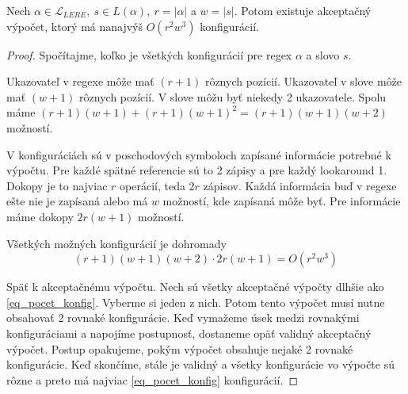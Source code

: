 \documentclass{svk_long_sk}
\def\lel{\mathscr{L}_{LERE}}
\begin{document}
\begin{lemma}\label{lema_dlzka_post_konfig}
Nech $\alpha \in \lel,~ s \in L(\alpha),~ r = |\alpha|$ a $w = |s|$. Potom existuje akceptačný výpočet, ktorý má nanajvýš $O(r^2w^3)$ konfigurácií.
\end{lemma}
\begin{proof}
Spočítajme, koľko je všetkých konfigurácií pre regex $\alpha$ a slovo $s$.

Ukazovateľ v regexe môže mať $(r+1)$ rôznych pozícií. Ukazovateľ v slove môže mať $(w+1)$ rôznych pozícií. V slove môžu byť niekedy 2 ukazovatele. Spolu máme $(r+1)(w+1)+(r+1)(w+1)^2 = (r+1)(w+1)(w+2)$ možností.

V konfiguráciách sú v poschodových symboloch zapísané informácie potrebné k výpočtu. Pre každé spätné referencie sú to 2 zápisy a pre každý lookaround 1. Dokopy je to najviac $r$ operácií, teda $2r$ zápisov. Každá informácia buď v regexe ešte nie je zapísaná alebo má $w$ možností, kde zapísaná môže byť. Pre informácie máme dokopy $2r(w+1)$ možností.

Všetkých možných konfigurácií je dohromady
\begin{equation}\label{eq_pocet_konfig}
(r+1)(w+1)(w+2)\cdot 2r(w+1) = O(r^2w^3)
\end{equation}

Späť k akceptačnému výpočtu. Nech sú všetky akceptačné výpočty dlhšie ako \eqref{eq_pocet_konfig}. Vyberme si jeden z nich. Potom tento výpočet musí nutne obsahovať 2 rovnaké konfigurácie. Keď vymažeme úsek medzi rovnakými konfiguráciami a napojíme postupnosť, dostaneme opäť validný akceptačný výpočet. Postup opakujeme, pokým výpočet obsahuje nejaké 2 rovnaké konfigurácie. Keď skončíme, stále je validný a všetky konfigurácie vo výpočte sú rôzne a preto má najviac \eqref{eq_pocet_konfig} konfigurácií.
\end{proof}
\end{document}

